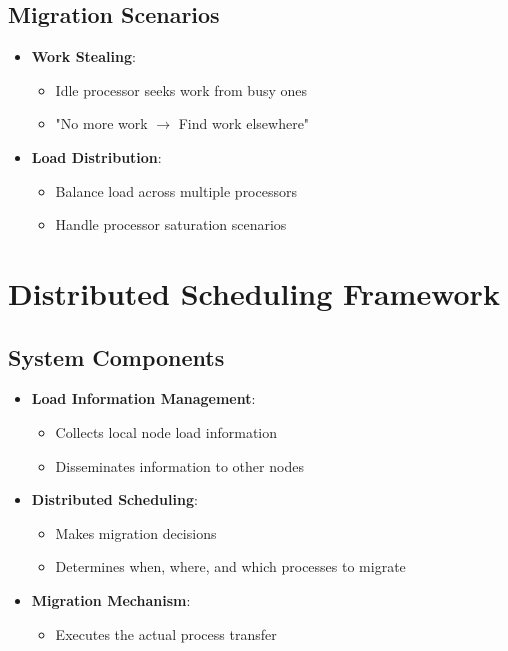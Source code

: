 \documentclass[12pt]{article}
\begin{document}
\subsection{Migration Scenarios}
\begin{itemize}
  \item \textbf{Work Stealing}:
        \begin{itemize}
          \item Idle processor seeks work from busy ones
          \item "No more work $\rightarrow$ Find work elsewhere"
        \end{itemize}

  \item \textbf{Load Distribution}:
        \begin{itemize}
          \item Balance load across multiple processors
          \item Handle processor saturation scenarios
        \end{itemize}
\end{itemize}

\section{Distributed Scheduling Framework}

\subsection{System Components}
\begin{itemize}
  \item \textbf{Load Information Management}:
        \begin{itemize}
          \item Collects local node load information
          \item Disseminates information to other nodes
        \end{itemize}

  \item \textbf{Distributed Scheduling}:
        \begin{itemize}
          \item Makes migration decisions
          \item Determines when, where, and which processes to migrate
        \end{itemize}

  \item \textbf{Migration Mechanism}:
        \begin{itemize}
          \item Executes the actual process transfer
        \end{itemize}
\end{itemize}
\end{document}
